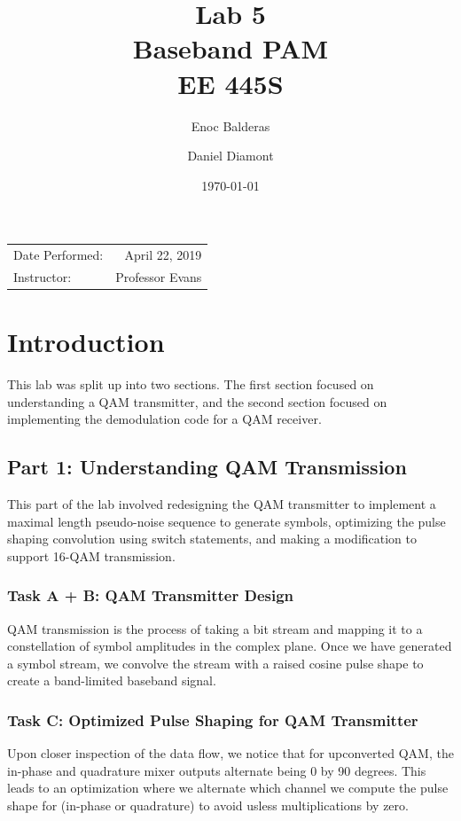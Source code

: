 \documentclass{article}
\title{Lab 5\\ Baseband PAM\\ EE 445S} %
\author{Enoc Balderas\\
        \and
        Daniel Diamont\\} %
\date{\today} %
\begin{document}
\maketitle %

\begin{center}
\begin{tabular}{l r}
Date Performed: & April 22, 2019 \\ %
Instructor: & Professor Evans %
\end{tabular}
\end{center}



\section{Introduction}
This lab was split up into two sections. The first section focused on understanding a QAM transmitter, and the second section focused on implementing the demodulation code for a QAM receiver.

\subsection{Part 1: Understanding QAM Transmission}
This part of the lab involved redesigning the QAM transmitter to implement a maximal length pseudo-noise sequence to generate symbols, optimizing the pulse shaping convolution using switch statements, and making a modification to support 16-QAM transmission.

\subsubsection{Task A + B: QAM Transmitter Design}
QAM transmission is the process of taking a bit stream and mapping it to a constellation of symbol amplitudes in the complex plane. Once we have generated a symbol stream, we convolve the stream with a raised cosine pulse shape to create a band-limited baseband signal.

\subsubsection{Task C: Optimized Pulse Shaping for QAM Transmitter}
Upon closer inspection of the data flow, we notice that for upconverted QAM, the in-phase and quadrature mixer outputs alternate being 0 by 90 degrees. This leads to an optimization where we alternate which channel we compute the pulse shape for (in-phase or quadrature) to avoid usless multiplications by zero.
\end{document}
